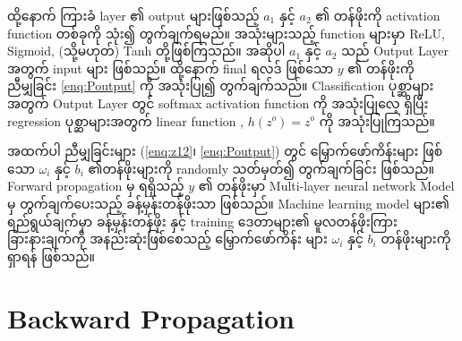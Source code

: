 ထို့နောက်  ကြားခံ layer ၏ output များဖြစ်သည့် $a_1$ နှင့် $a_2$ ၏ တန်ဖိုးကို activation function တစ်ခုကို သုံး၍ တွက်ချက်ရမည်။ အသုံးများသည့်  function များမှာ ReLU, Sigmoid, (သို့မဟုတ်) Tanh တို့ဖြစ်ကြသည်။ အဆိုပါ $a_1$ နှင့် $a_2$ သည် Output Layer အတွက် input များ ဖြစ်သည်။ ထို့နောက် final ရလဒ် ဖြစ်သော  $y$ ၏ တန်ဖိုးကို ညီမျှခြင်း \ref{enq:Poutput} ကို အသုံးပြု၍ တွက်ချက်သည်။ Classification ပုစ္ဆာများအတွက် Output Layer တွင် softmax  activation function ကို အသုံးပြုလေ့ ရှိပြီး regression ပုစ္ဆာများအတွက် linear function , $h(z^o) = z^o$ ကို အသုံးပြုကြသည်။ 

အထက်ပါ ညီမျှခြင်းများ (\ref{enq:z12}၊ \ref{enq:Poutput}) တွင် မြှောက်ဖော်ကိန်းများ ဖြစ်သော $\omega_{i}$ နှင့် $b_i$ ၏တန်ဖိုးများကို randomly သတ်မှတ်၍ တွက်ချက်ခြင်း ဖြစ်သည်။ Forward propagation မှ ရရှိသည့် $y$ ၏ တန်ဖိုးမှာ Multi-layer neural network Model မှ တွက်ချက်ပေးသည့် ခန့်မှန်းတန်ဖိုးသာ ဖြစ်သည်။ Machine learning model များ၏ ရည်ရွယ်ချက်မှာ ခန့်မှန်းတန်ဖိုး နှင့် training ဒေတာများ၏ မူလတန်ဖိုးကြား ခြားနားချက်ကို အနည်းဆုံးဖြစ်စေသည့် မြှောက်ဖော်ကိန်း များ $\omega_{i}$ နှင့် $b_i$ တန်ဖိုးများကို ရှာရန် ဖြစ်သည်။ 

\newpage
\section{Backward Propagation}\label{sec:bProp}

